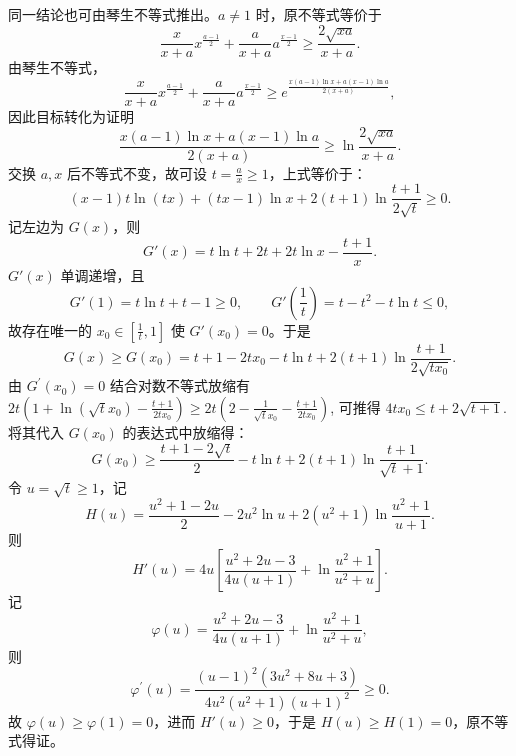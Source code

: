 \begin{solution}
同一结论也可由琴生不等式推出。$a\ne1$ 时，原不等式等价于
$$\frac{x}{x+a}x^{\frac{a-1}{2}}+\frac{a}{x+a}a^{\frac{x-1}{2}}\ge\frac{2\sqrt{xa}}{x+a}.$$
由琴生不等式，
$$\frac{x}{x+a}x^{\frac{a-1}{2}}+\frac{a}{x+a}a^{\frac{x-1}{2}}\ge e^{\frac{x(a-1)\ln x+a(x-1)\ln a}{2(x+a)}},$$
因此目标转化为证明
\[
\frac{x(a-1)\ln x+a(x-1)\ln a}{2(x+a)}\ge \ln\frac{2\sqrt{xa}}{x+a}.
\]
交换 $a,x$ 后不等式不变，故可设 $t=\frac{a}{x}\ge1$，上式等价于：
$$(x-1)t\ln(tx)+(tx-1)\ln x+2(t+1)\ln\frac{t+1}{2\sqrt{t}}\ge0.$$
记左边为 $G(x)$，则
\[
G'(x)=t\ln t+2t+2t\ln x-\frac{t+1}{x}.
\]
$G'(x)$ 单调递增，且
\[
G'(1)=t\ln t+t-1\ge0,\qquad G'\left(\frac1t\right)=t-t^2-t\ln t\le0,
\]
故存在唯一的 $x_0\in\left[\frac1t,1\right]$ 使 $G'(x_0)=0$。于是
$$G(x)\ge G(x_{0})=t+1-2tx_{0}-t\ln t+2(t+1)\ln\frac{t+1}{2\sqrt{tx_{0}}}.$$
由 $G^{\prime}(x_{0})=0$ 结合对数不等式放缩有 $2t\left(1+\ln(\sqrt{t}x_{0})-\frac{t+1}{2tx_{0}}\right)\ge2t\left(2-\frac{1}{\sqrt{t}x_{0}}-\frac{t+1}{2tx_{0}}\right)$, 可推得 $4tx_{0}\le t+2\sqrt{t+1}$.
将其代入 $G(x_{0})$ 的表达式中放缩得：
$$G(x_{0})\ge\frac{t+1-2\sqrt{t}}{2}-t\ln t+2(t+1)\ln\frac{t+1}{\sqrt{t}+1}.$$
令 $u=\sqrt t\ge1$，记
\[
H(u)=\frac{u^{2}+1-2u}{2}-2u^{2}\ln u+2(u^{2}+1)\ln\frac{u^{2}+1}{u+1}.
\]
则
\[
H'(u)=4u\left[\frac{u^{2}+2u-3}{4u(u+1)}+\ln\frac{u^{2}+1}{u^{2}+u}\right].
\]
记
\[
\varphi(u)=\frac{u^{2}+2u-3}{4u(u+1)}+\ln\frac{u^{2}+1}{u^{2}+u},
\]
则
$$\varphi^{\prime}(u)=\frac{(u-1)^{2}(3u^{2}+8u+3)}{4u^{2}(u^{2}+1)(u+1)^{2}}\ge0.$$
故 $\varphi(u)\ge\varphi(1)=0$，进而 $H'(u)\ge0$，于是 $H(u)\ge H(1)=0$，原不等式得证。
\end{solution}


